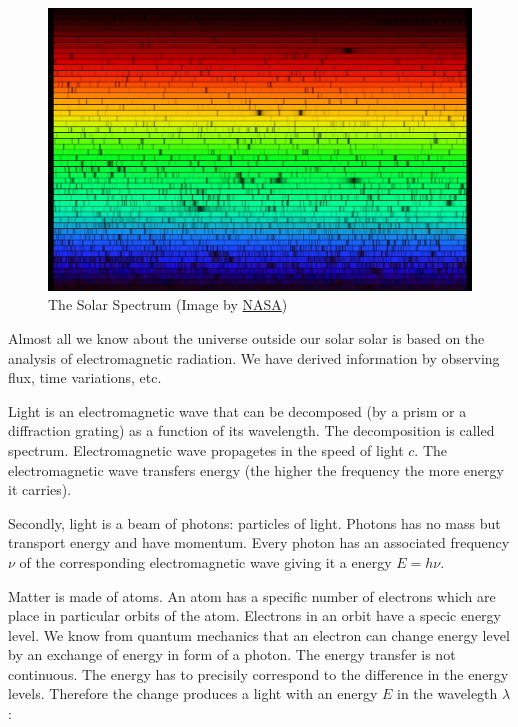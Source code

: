 \begin{figure}
	\includegraphics[width=\textwidth]{img/solarspectrum.jpg}
	\caption{The Solar Spectrum (Image by \href{https://solarsystem.nasa.gov/resources/390/the-solar-spectrum/}{NASA})}
	\label{solar_spectrum}
\end{figure}

Almost all we know about the universe outside our solar solar is based on the analysis of electromagnetic radiation.
We have derived information by observing flux, time variations, etc.~\cite{appenzeller2012}

Light is an electromagnetic wave that can be decomposed (by a prism or a diffraction grating) as a function of its wavelength.
The decomposition is called spectrum.
Electromagnetic wave propagetes in the speed of light \(c\).
The electromagnetic wave transfers energy
(the higher the frequency the more energy it carries).~\cite{cochard2018}

Secondly, light is a beam of photons: particles of light.
Photons has no mass but transport energy and have momentum.
Every photon has an associated frequency \(\nu\) of the corresponding electromagnetic wave giving it a energy \(E = h \nu\).

Matter is made of atoms.
An atom has a specific number of electrons which are place in particular orbits of the atom.
Electrons in an orbit have a specic energy level.
We know from quantum mechanics that an electron can change energy level by an exchange of energy in form of a photon.
The energy transfer is not continuous.
The energy has to precisily correspond to the difference in the energy levels.
Therefore the change produces a light with an energy \(E\) in the wavelegth \(\lambda\):

